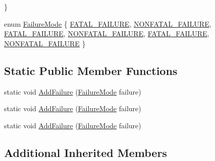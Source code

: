 \begin{DoxyCompactItemize}
 \}
\item 
enum \mbox{\hyperlink{class_expect_failure_test_aad05da10bb15d21a434eba3b37011406}{Failure\+Mode}} \{ \newline
\mbox{\hyperlink{class_expect_failure_test_aad05da10bb15d21a434eba3b37011406aa1d003ba2906cb7abf2dfefa7820f3de}{F\+A\+T\+A\+L\+\_\+\+F\+A\+I\+L\+U\+RE}}, 
\mbox{\hyperlink{class_expect_failure_test_aad05da10bb15d21a434eba3b37011406a33bb9a7c037092ef3fe3e8f66bb2d518}{N\+O\+N\+F\+A\+T\+A\+L\+\_\+\+F\+A\+I\+L\+U\+RE}}, 
\mbox{\hyperlink{class_expect_failure_test_aad05da10bb15d21a434eba3b37011406aa1d003ba2906cb7abf2dfefa7820f3de}{F\+A\+T\+A\+L\+\_\+\+F\+A\+I\+L\+U\+RE}}, 
\mbox{\hyperlink{class_expect_failure_test_aad05da10bb15d21a434eba3b37011406a33bb9a7c037092ef3fe3e8f66bb2d518}{N\+O\+N\+F\+A\+T\+A\+L\+\_\+\+F\+A\+I\+L\+U\+RE}}, 
\newline
\mbox{\hyperlink{class_expect_failure_test_aad05da10bb15d21a434eba3b37011406aa1d003ba2906cb7abf2dfefa7820f3de}{F\+A\+T\+A\+L\+\_\+\+F\+A\+I\+L\+U\+RE}}, 
\mbox{\hyperlink{class_expect_failure_test_aad05da10bb15d21a434eba3b37011406a33bb9a7c037092ef3fe3e8f66bb2d518}{N\+O\+N\+F\+A\+T\+A\+L\+\_\+\+F\+A\+I\+L\+U\+RE}}
 \}
\end{DoxyCompactItemize}
\subsection*{Static Public Member Functions}
\begin{DoxyCompactItemize}
\item 
static void \mbox{\hyperlink{class_expect_failure_test_ab9aeb7820ff7953fc2975ecc5abd046b}{Add\+Failure}} (\mbox{\hyperlink{class_expect_failure_test_aad05da10bb15d21a434eba3b37011406}{Failure\+Mode}} failure)
\item 
static void \mbox{\hyperlink{class_expect_failure_test_ab9aeb7820ff7953fc2975ecc5abd046b}{Add\+Failure}} (\mbox{\hyperlink{class_expect_failure_test_aad05da10bb15d21a434eba3b37011406}{Failure\+Mode}} failure)
\item 
static void \mbox{\hyperlink{class_expect_failure_test_ab9aeb7820ff7953fc2975ecc5abd046b}{Add\+Failure}} (\mbox{\hyperlink{class_expect_failure_test_aad05da10bb15d21a434eba3b37011406}{Failure\+Mode}} failure)
\end{DoxyCompactItemize}
\subsection*{Additional Inherited Members}


